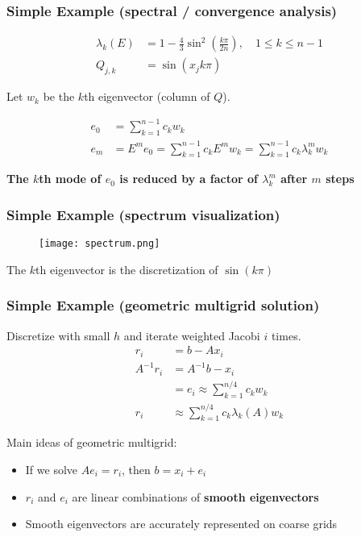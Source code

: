 \documentclass[xcolor=dvipsnames]{beamer}
\begin{document}
\begin{frame}
  \frametitle{Simple Example (spectral / convergence analysis)}
  \begin{align*}
    \lambda_k(E) &= 1 - \frac{4}{3} \sin^2 \left(\frac{k \pi}{2 n} \right), \quad 1 \leq k \leq n-1\\
    Q_{j,k} &= \sin (x_j k \pi)
  \end{align*}

  Let $w_k$ be the $k$th eigenvector (column of $Q$).

  \begin{align*}
    e_0 &= \sum_{k=1}^{n-1} c_k w_k\\ 
    e_m &= E^m e_0
    = \sum_{k=1}^{n-1} c_k E^m w_k
    = \sum_{k=1}^{n-1} c_k \lambda_k^m w_k
  \end{align*}

  \textbf{The $k$th mode of $e_0$ is reduced by a factor of $\lambda_k^m$ after $m$ steps}
\end{frame}

\begin{frame}
  \frametitle{Simple Example (spectrum visualization)}
  \begin{figure}
    \texttt{[image: spectrum.png]}
  \end{figure}
  The $k$th eigenvector is the discretization of $\sin(k\pi)$
\end{frame}

\begin{frame}
  \frametitle{Simple Example (geometric multigrid solution)}
  Discretize with small $h$ and iterate weighted Jacobi $i$ times.
  \begin{align*}
    r_i &= b - Ax_i\\ 
    A^{-1} r_i &= A^{-1} b - x_i\\
    &= e_i \approx \sum_{k=1}^{n/4} c_k w_k \\
    r_i & \approx  \sum_{k=1}^{n/4} c_k \lambda_k(A) w_k 
  \end{align*}

  Main ideas of geometric multigrid:
  \begin{itemize}
    \item If we solve $Ae_i = r_i$, then $b = x_i + e_i$
    \item $r_i$ and $e_i$ are linear combinations of \textbf{smooth eigenvectors} 
    \item Smooth eigenvectors are accurately represented on coarse grids
  \end{itemize}
\end{frame}
\end{document}
